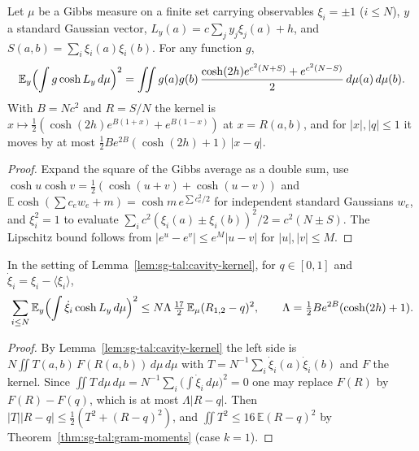 \begin{lemma}
\label{lem:sg-tal:cavity-kernel}
  \leanok
{}
Let $\mu$ be a Gibbs measure on a finite set carrying observables $\xi_i=\pm1$ ($i\le N$), $y$ a standard Gaussian vector, $L_y(a)=c\sum_jy_j\xi_j(a)+h$, and $S(a,b)=\sum_i\xi_i(a)\xi_i(b)$.  For any function $g$,
\[
\mathbb E_y\Bigl(\int g\cosh L_y\,d\mu\Bigr)^2=\iint g(a)g(b)\,\frac{\cosh(2h)e^{c^2(N+S)}+e^{c^2(N-S)}}2\,d\mu(a)\,d\mu(b).
\]
With $B=Nc^2$ and $R=S/N$ the kernel is $x\mapsto\frac12(\cosh(2h)e^{B(1+x)}+e^{B(1-x)})$ at $x=R(a,b)$, and for $|x|,|q|\le1$ it moves by at most $\frac12Be^{2B}(\cosh(2h)+1)\,|x-q|$.
\end{lemma}
\begin{proof}
  \leanok
Expand the square of the Gibbs average as a double sum, use $\cosh u\cosh v=\frac12(\cosh(u+v)+\cosh(u-v))$ and $\mathbb E\cosh(\sum c_ew_e+m)=\cosh m\,e^{\sum c_e^2/2}$ for independent standard Gaussians $w_e$, and $\xi_i^2=1$ to evaluate $\sum_i c^2(\xi_i(a)\pm\xi_i(b))^2/2=c^2(N\pm S)$.  The Lipschitz bound follows from $|e^u-e^v|\le e^M|u-v|$ for $|u|,|v|\le M$.
\end{proof}

\begin{theorem}
\label{thm:sg-tal:cavity-deviation-sum}
  \leanok
{}
In the setting of Lemma~\ref{lem:sg-tal:cavity-kernel}, for $q\in[0,1]$ and $\dot\xi_i=\xi_i-\langle\xi_i\rangle$,
\[
\sum_{i\le N}\mathbb E_y\Bigl(\int\dot\xi_i\cosh L_y\,d\mu\Bigr)^2\le N\Lambda\,\tfrac{17}2\,\mathbb E_\mu(R_{1,2}-q)^2,\qquad\Lambda=\tfrac12Be^{2B}(\cosh(2h)+1).
\]
\end{theorem}
\begin{proof}
  \leanok
By Lemma~\ref{lem:sg-tal:cavity-kernel} the left side is $N\iint T(a,b)\,F(R(a,b))\,d\mu\,d\mu$ with $T=N^{-1}\sum_i\dot\xi_i(a)\dot\xi_i(b)$ and $F$ the kernel.  Since $\iint T\,d\mu\,d\mu=N^{-1}\sum_i\bigl(\int\dot\xi_i\,d\mu\bigr)^2=0$ one may replace $F(R)$ by $F(R)-F(q)$, which is at most $\Lambda|R-q|$.  Then $|T||R-q|\le\frac12(T^2+(R-q)^2)$, and $\iint T^2\le16\,\mathbb E(R-q)^2$ by Theorem~\ref{thm:sg-tal:gram-moments} (case $k=1$).
\end{proof}

